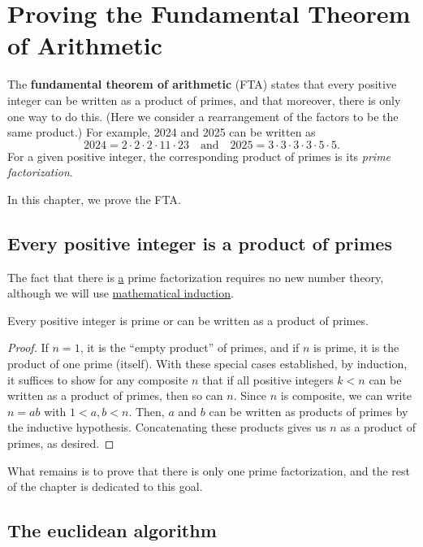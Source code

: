 \section{Proving the Fundamental Theorem of Arithmetic}

The \textbf{fundamental theorem of arithmetic} (FTA) states that every positive integer can be written as a product of primes, and that moreover, there is only one way to do this. (Here we consider a rearrangement of the factors to be the same product.) For example, 2024 and 2025 can be written as
\begin{equation*}
2024 = 2\cdot 2\cdot 2\cdot 11\cdot 23\quad\text{and}\quad 2025 = 3\cdot 3\cdot 3\cdot 3\cdot 5\cdot 5.
\end{equation*}
For a given positive integer, the corresponding product of primes is its \emph{prime factorization}.

In this chapter, we prove the FTA.


\subsection{Every positive integer is a product of primes}

The fact that there is \underline{a} prime factorization requires no new number theory, although we will use \href{https://en.wikipedia.org/wiki/Mathematical_induction}{mathematical induction}.

\begin{theorem}
Every positive integer is prime or can be written as a product of primes.
\end{theorem}
\begin{proof}
If $n = 1$, it is the ``empty product'' of primes, and if $n$ is prime, it is the product of one prime (itself). With these special cases established, by induction, it suffices to show for any composite $n$ that if all positive integers $k < n$ can be written as a product of primes, then so can $n$. Since $n$ is composite, we can write $n = ab$ with $1 < a,b < n$. Then, $a$ and $b$ can be written as products of primes by the inductive hypothesis. Concatenating these products gives us $n$ as a product of primes, as desired.
\end{proof}

What remains is to prove that there is only one prime factorization, and the rest of the chapter is dedicated to this goal.


\subsection{The euclidean algorithm}

